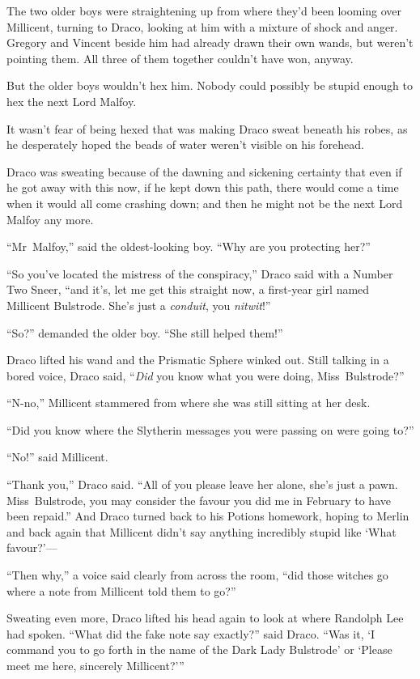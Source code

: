 The two older boys were straightening up from where they’d been looming over Millicent, turning to Draco, looking at him with a mixture of shock and anger. Gregory and Vincent beside him had already drawn their own wands, but weren’t pointing them. All three of them together couldn’t have won, anyway.

But the older boys wouldn’t hex him. Nobody could possibly be stupid enough to hex the next Lord Malfoy.

It wasn’t fear of being hexed that was making Draco sweat beneath his robes, as he desperately hoped the beads of water weren’t visible on his forehead.

Draco was sweating because of the dawning and sickening certainty that even if he got away with this now, if he kept down this path, there would come a time when it would all come crashing down; and then he might not be the next Lord Malfoy any more.

“Mr~Malfoy,” said the oldest-looking boy. “Why are you protecting her?”

“So you’ve located the mistress of the conspiracy,” Draco said with a Number Two Sneer, “and it’s, let me get this straight now, a first-year girl named Millicent Bulstrode. She’s just a \emph{conduit}, you \emph{nitwit}!”

“So?” demanded the older boy. “She still helped them!”

Draco lifted his wand and the Prismatic Sphere winked out. Still talking in a bored voice, Draco said, “\emph{Did} you know what you were doing, Miss~Bulstrode?”

“N-no,” Millicent stammered from where she was still sitting at her desk.

“Did you know where the Slytherin messages you were passing on were going to?”

“No!” said Millicent.

“Thank you,” Draco said. “All of you please leave her alone, she’s just a pawn. Miss~Bulstrode, you may consider the favour you did me in February to have been repaid.” And Draco turned back to his Potions homework, hoping to Merlin and back again that Millicent didn’t say anything incredibly stupid like ‘What favour?’—

“Then why,” a voice said clearly from across the room, “did those witches go where a note from Millicent told them to go?”

Sweating even more, Draco lifted his head again to look at where Randolph Lee had spoken. “What did the fake note say exactly?” said Draco. “Was it, ‘I command you to go forth in the name of the Dark Lady Bulstrode’ or ‘Please meet me here, sincerely Millicent?’”

